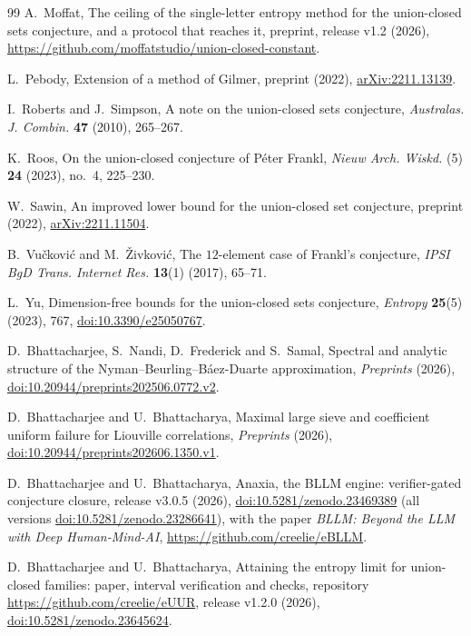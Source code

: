 \documentclass[12pt]{article}
\theoremstyle{plain}
\begin{document}
\begin{thebibliography}{99}
 A.~Moffat, The ceiling of the single-letter entropy method for the union-closed sets conjecture, and a protocol that reaches it, preprint, release v1.2 (2026), \url{https://github.com/moffatstudio/union-closed-constant}.

 L.~Pebody, Extension of a method of Gilmer, preprint (2022), \href{https://arxiv.org/abs/2211.13139}{arXiv:2211.13139}.

 I.~Roberts and J.~Simpson, A note on the union-closed sets conjecture, \emph{Australas. J. Combin.} \textbf{47} (2010), 265--267.

 K.~Roos, On the union-closed conjecture of P\'eter Frankl, \emph{Nieuw Arch. Wiskd.} (5) \textbf{24} (2023), no.~4, 225--230.

 W.~Sawin, An improved lower bound for the union-closed set conjecture, preprint (2022), \href{https://arxiv.org/abs/2211.11504}{arXiv:2211.11504}.

 B.~Vu\v{c}kovi\'c and M.~\v{Z}ivkovi\'c, The $12$-element case of Frankl's conjecture, \emph{IPSI BgD Trans. Internet Res.} \textbf{13}(1) (2017), 65--71.

 L.~Yu, Dimension-free bounds for the union-closed sets conjecture, \emph{Entropy} \textbf{25}(5) (2023), 767, \href{https://doi.org/10.3390/e25050767}{doi:10.3390/e25050767}.

 D.~Bhattacharjee, S.~Nandi, D.~Frederick and S.~Samal, Spectral and analytic structure of the Nyman--Beurling--B\'aez-Duarte approximation, \emph{Preprints} (2026), \href{https://doi.org/10.20944/preprints202506.0772.v2}{doi:10.20944/preprints202506.0772.v2}.

 D.~Bhattacharjee and U.~Bhattacharya, Maximal large sieve and coefficient uniform failure for Liouville correlations, \emph{Preprints} (2026), \href{https://doi.org/10.20944/preprints202606.1350.v1}{doi:10.20944/preprints202606.1350.v1}.

 D.~Bhattacharjee and U.~Bhattacharya, Anaxia, the BLLM engine: verifier-gated conjecture closure, release v3.0.5 (2026), \href{https://doi.org/10.5281/zenodo.23469389}{doi:10.5281/zenodo.23469389} (all versions \href{https://doi.org/10.5281/zenodo.23286641}{doi:10.5281/zenodo.23286641}), with the paper \emph{BLLM: Beyond the LLM with Deep Human-Mind-AI}, \url{https://github.com/creelie/eBLLM}.

 D.~Bhattacharjee and U.~Bhattacharya, Attaining the entropy limit for union-closed families: paper, interval verification and checks, repository \url{https://github.com/creelie/eUUR}, release v1.2.0 (2026), \href{https://doi.org/10.5281/zenodo.23645624}{doi:10.5281/zenodo.23645624}.

\end{thebibliography}
\end{document}
